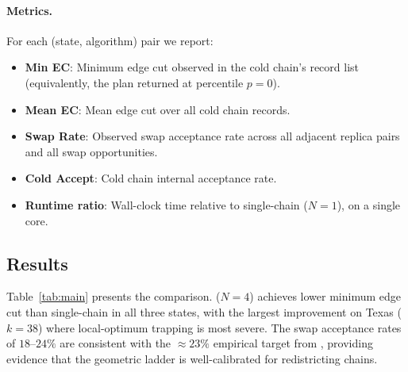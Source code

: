 \paragraph{Metrics.}
For each (state, algorithm) pair we report:
\begin{itemize}
\item \textbf{Min EC}: Minimum edge cut observed in the cold chain's record list
  (equivalently, the plan returned at percentile $p=0$).
\item \textbf{Mean EC}: Mean edge cut over all cold chain records.
\item \textbf{Swap Rate}: Observed swap acceptance rate across all adjacent
  replica pairs and all swap opportunities.
\item \textbf{Cold Accept}: Cold chain internal \fr{} acceptance rate.
\item \textbf{Runtime ratio}: Wall-clock time relative to single-chain
  \fr{} ($N=1$), on a single core.
\end{itemize}

\subsection{Results}

Table~\ref{tab:main} presents the comparison.
\pt{}($N=4$) achieves lower minimum edge cut than single-chain \fr{} in all
three states, with the largest improvement on Texas ($k=38$) where local-optimum
trapping is most severe.
The swap acceptance rates of $18$--$24\%$ are consistent with the
${\approx}23\%$ empirical target from \citet{kone2005}, providing evidence that
the geometric ladder is well-calibrated for redistricting chains.

